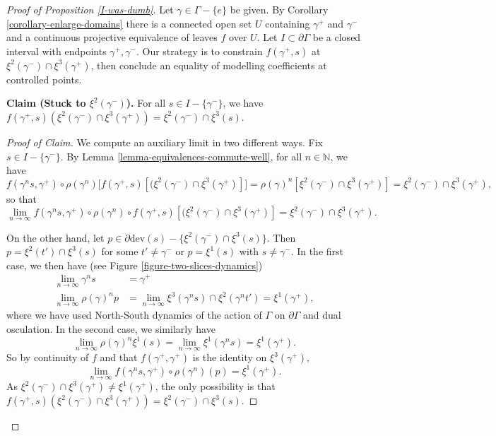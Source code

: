 \documentclass[12pt,a4paper]{amsart}
\theoremstyle{definition}
\theoremstyle{plain}
\numberwithin{equation}{section}
\begin{document}
\begin{proof}[Proof of Proposition \ref{I-was-dumb}]
    Let $\gamma \in \Gamma - \{e\}$ be given. By Corollary \ref{corollary-enlarge-domains} there is a connected open set $U$ containing $\gamma^+$ and $\gamma^-$ and a continuous projective equivalence of leaves $f$ over $U$. Let $I \subset \partial \Gamma$ be a closed interval with endpoints $\gamma^+, \gamma^-$. Our strategy is to constrain $f(\gamma^+, s)$ at $\xi^2(\gamma^{-}) \cap \xi^3(\gamma^+)$, then conclude an equality of modelling coefficients at controlled points.

    \textbf{Claim (Stuck to $\xi^2(\gamma^-)$).} For all $s \in I - \{\gamma^-\}$, we have $f(\gamma^+, s)(\xi^2(\gamma^-) \cap \xi^3(\gamma^+)) = \xi^2(\gamma^-) \cap \xi^3(s)$.

    \begin{proof}[Proof of Claim] We compute an auxiliary limit in two different ways. Fix $s \in I - \{\gamma^-\}$. By Lemma \ref{lemma-equivalences-commute-well}, for all $n \in \mathbb{N}$, we have $$ f(\gamma^n s, \gamma^+) \circ \rho(\gamma^n) \big[ f(\gamma^+, s)[(\xi^2(\gamma^{-} )\cap \xi^3(\gamma^+)]\big] = \rho(\gamma)^n [\xi^2(\gamma^{-}) \cap \xi^3(\gamma^+)] = \xi^2(\gamma^{-}) \cap \xi^3(\gamma^+),$$ so that $$\lim_{n \to \infty} f(\gamma^n s, \gamma^+) \circ \rho(\gamma^n) \circ f(\gamma^+, s)[(\xi^2(\gamma^{-} )\cap \xi^3(\gamma^+)] = \xi^2(\gamma^{-}) \cap \xi^3(\gamma^+).$$
    
    On the other hand, let $p \in \partial \text{dev}(s) - \{ \xi^2(\gamma^-) \cap \xi^3(s)\}$. Then $p = \xi^2(t') \cap \xi^3(s)$ for some $t' \neq \gamma^{-}$ or $p = \xi^1(s)$ with $s \neq \gamma^-$. In the first case, we then have (see Figure \ref{figure-two-slices-dynamics}) \begin{align*} \lim_{n \to \infty} \gamma^n s &= \gamma^+ \\ 
    \lim_{n \to \infty}  \rho(\gamma)^n p &= \lim_{n \to \infty} \xi^3(\gamma^n s) \cap \xi^2(\gamma^n t') = \xi^1(\gamma^+), \end{align*} where we have used North-South dynamics of the action of $\Gamma$ on $\partial \Gamma$ and dual osculation. In the second case, we similarly have $$\lim_{n \to \infty} \rho(\gamma)^n \xi^1(s) = \lim_{n \to \infty} \xi^1(\gamma^n s) = \xi^1 (\gamma^+).$$ So by continuity of $f$ and that $f(\gamma^+, \gamma^+)$ is the identity on $\xi^3(\gamma^+),$
    $$\lim_{n \to \infty} f(\gamma^n s, \gamma^+) \circ \rho(\gamma^n) (p) = \xi^1(\gamma^+).$$ 
    As $\xi^2(\gamma^-) \cap \xi^3(\gamma^+) \neq \xi^1(\gamma^+)$, the only possibility is that $f(\gamma^+, s)(\xi^2(\gamma^-) \cap \xi^3(\gamma^+)) = \xi^2(\gamma^-) \cap \xi^3(s)$.
\end{proof}   



\end{proof}
\end{document}
